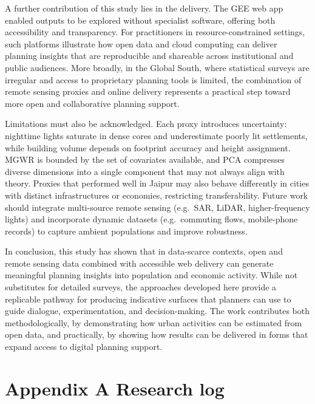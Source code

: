 \documentclass[
  12pt,
  oneside]{book}
\begin{document}
A further contribution of this study lies in the delivery. The GEE web app enabled outputs to be explored without specialist software, offering both accessibility and transparency. For practitioners in resource-constrained settings, such platforms illustrate how open data and cloud computing can deliver planning insights that are reproducible and shareable across institutional and public audiences. More broadly, in the Global South, where statistical surveys are irregular and access to proprietary planning tools is limited, the combination of remote sensing proxies and online delivery represents a practical step toward more open and collaborative planning support.

Limitations must also be acknowledged. Each proxy introduces uncertainty: nighttime lights saturate in dense cores and underestimate poorly lit settlements, while building volume depends on footprint accuracy and height assignment. MGWR is bounded by the set of covariates available, and PCA compresses diverse dimensions into a single component that may not always align with theory. Proxies that performed well in Jaipur may also behave differently in cities with distinct infrastructures or economies, restricting transferability. Future work should integrate multi-source remote sensing (e.g.~SAR, LiDAR, higher-frequency lights) and incorporate dynamic datasets (e.g.~commuting flows, mobile-phone records) to capture ambient populations and improve robustness.

In conclusion, this study has shown that in data-scarce contexts, open and remote sensing data combined with accessible web delivery can generate meaningful planning insights into population and economic activity. While not substitutes for detailed surveys, the approaches developed here provide a replicable pathway for producing indicative surfaces that planners can use to guide dialogue, experimentation, and decision-making. The work contributes both methodologically, by demonstrating how urban activities can be estimated from open data, and practically, by showing how results can be delivered in forms that expand access to digital planning support.

\printbibliography

\chapter*{Appendix A Research log}\label{appendix-a-research-log}
\end{document}
